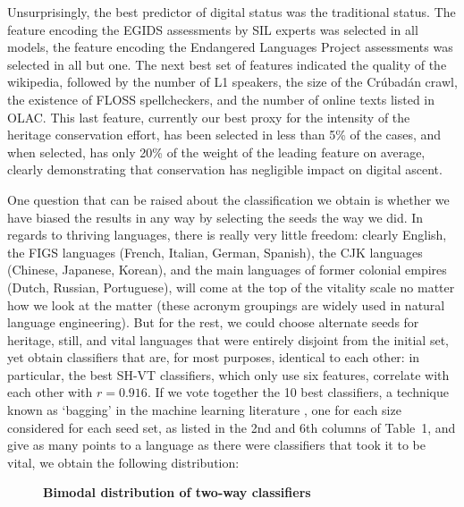 \documentclass[10pt]{article}
\begin{document}
Unsurprisingly, the best predictor of digital status was the traditional
status. The feature encoding the EGIDS assessments by SIL experts was selected
in all models, the feature encoding the Endangered Languages Project
assessments was selected in all but one. The next best set of features
indicated the quality of the wikipedia, followed by the number of L1 speakers,
the size of the Cr\'ubad\'an crawl, the existence of FLOSS spellcheckers, and
the number of online texts listed in OLAC. {\color{black} This last feature,
  currently our best proxy for the intensity of the heritage conservation
  effort, has been selected in less than 5\% of the cases, and when selected, has
  only 20\% of the weight of the leading feature on average, clearly demonstrating 
  that conservation has negligible impact on digital ascent.}  

One question that can be raised about the classification we obtain is whether
we have biased the results in any way by selecting the seeds the way we
did. In regards to thriving languages, there is really very little freedom:
clearly English, the FIGS languages (French, Italian, German, Spanish), the
CJK languages (Chinese, Japanese, Korean), and the main languages of former
colonial empires (Dutch, Russian, Portuguese), will come at the top of the
vitality scale no matter how we look at the matter (these acronym groupings
are widely used in natural language engineering). But for the rest, we could
choose alternate seeds for heritage, still, and vital languages that were
entirely disjoint from the initial set, yet obtain classifiers that are, for
most purposes, identical to each other: in particular, the best SH-VT
classifiers, which only use six features, correlate with each other with
$r=0.916$. If we vote together the 10 best classifiers,
{\color{black} a technique known as `bagging' in the machine learning
  literature \cite{Breiman:1996},}  one for each size
considered for each seed set, as listed in the 2nd and 6th columns of Table~1, 
and give as many points to a language as there were classifiers that took it
to be vital, we obtain the following distribution:

\newpage
\begin{figure}[h!]
\begin{center}

\caption{{\bf Bimodal distribution of two-way classifiers}}
\end{center}
\label{Figure_1}
\end{figure}
\end{document}
